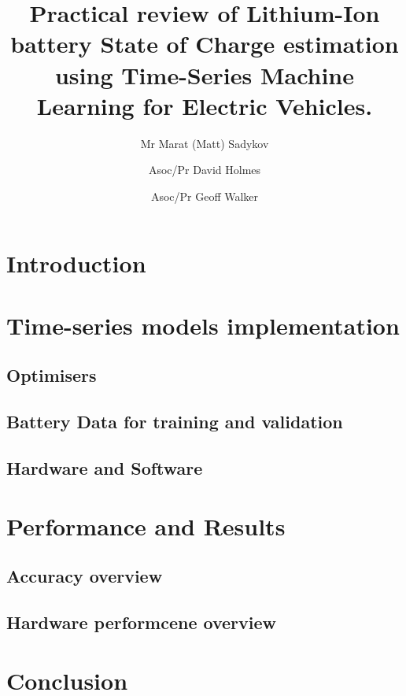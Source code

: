 \documentclass[fleqn,12pt]{olplainarticle}
\title{Practical review of Lithium-Ion battery State of Charge estimation using Time-Series Machine Learning for Electric Vehicles.}
\author[1]{Mr Marat (Matt) Sadykov}
\author[2]{Asoc/Pr David Holmes}
\author[3]{Asoc/Pr Geoff Walker}
\affil[1]{Queensland University of Technology}
\begin{document}
\flushbottom
\maketitle
\thispagestyle{empty}
\section{Introduction} \label{sec:Introduction}

\section{Time-series models implementation} \label{sec:Body}

    
    
\subsection{Optimisers} \label{subsec:optimisers}

    
    
    
\subsection{Battery Data for training and validation} \label{subsec:b_data}

\subsection{Hardware and Software} \label{subsec:soft}

\section{Performance and Results}\label{sec:results}
\subsection{Accuracy overview}

\subsection{Hardware performcene overview}

\section{Conclusion} \label{sec:conclussion}


\end{document}
